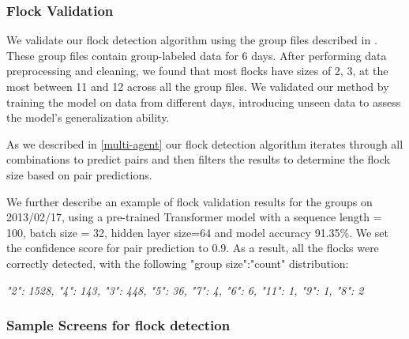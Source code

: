 \documentclass{article}
\begin{document}
\subsubsection{Flock Validation}

We validate our flock detection algorithm using the group files described in \cite{zanlungo2015pedestrian}. These group files contain group-labeled data for 6 days. After performing data preprocessing and cleaning, we found that most flocks have sizes of 2, 3, at the most between 11 and 12 across all the group files. We validated our method by training the model on data from different days, introducing unseen data to assess the model's generalization ability.

As we described in \ref{multi-agent} our flock detection algorithm iterates through all combinations to predict pairs and then filters the results to determine the flock size based on pair predictions. 

We further describe an example of flock validation results for the groups on 2013/02/17, using a pre-trained Transformer model with a sequence length = 100, batch size = 32, hidden layer size=64 and model accuracy 91.35\%. We set the confidence score for pair prediction to 0.9. As a result, all the flocks were correctly detected, with the following "group size":"count" distribution:

\textit{{"2": 1528, "4": 143, "3": 448, "5": 36, "7": 4, "6": 6, "11": 1, "9": 1, "8": 2}}


\subsubsection{Sample Screens for flock detection}
\end{document}
